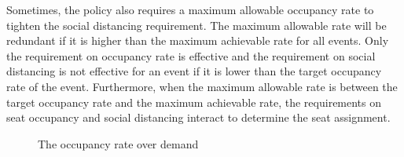 Sometimes, the policy also requires a maximum allowable occupancy rate to tighten the social distancing requirement. The maximum allowable rate will be redundant if it is higher than the maximum achievable rate for all events. Only the requirement on occupancy rate is effective and the requirement on social distancing is not effective for an event if it is lower than the target occupancy rate of the event. Furthermore, when the maximum allowable rate is between the target occupancy rate and the maximum achievable rate, the requirements on seat occupancy and social distancing interact to determine the seat assignment.



\begin{figure}[h]
  \centering
  \caption{The occupancy rate over demand}
  \label{occupancy_rate_demand}
\end{figure}


